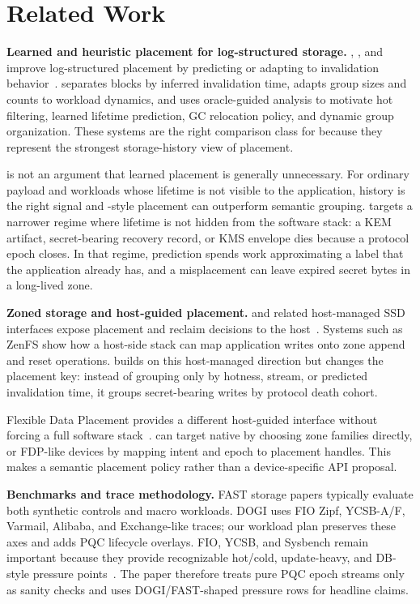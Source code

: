 \section{Related Work}

\noindent\textbf{Learned and heuristic placement for log-structured storage.}
\sepbit, \midas, and \dogi improve log-structured placement by predicting or adapting to invalidation behavior~\cite{sepbit,midas,dogi}.  \sepbit separates blocks by inferred invalidation time, \midas adapts group sizes and counts to workload dynamics, and \dogi uses oracle-guided analysis to motivate hot filtering, learned lifetime prediction, GC relocation policy, and dynamic group organization.  These systems are the right comparison class for \system because they represent the strongest storage-history view of placement.

\system is not an argument that learned placement is generally unnecessary.  For ordinary payload and workloads whose lifetime is not visible to the application, history is the right signal and \dogi-style placement can outperform semantic grouping.  \system targets a narrower regime where lifetime is not hidden from the software stack: a KEM artifact, secret-bearing recovery record, or KMS envelope dies because a protocol epoch closes.  In that regime, prediction spends work approximating a label that the application already has, and a misplacement can leave expired secret bytes in a long-lived zone.

\noindent\textbf{Zoned storage and host-guided placement.}
\zns and related host-managed SSD interfaces expose placement and reclaim decisions to the host~\cite{zns,zenfs,xnvme}.  Systems such as ZenFS show how a host-side stack can map application writes onto zone append and reset operations.  \system builds on this host-managed direction but changes the placement key: instead of grouping only by hotness, stream, or predicted invalidation time, it groups secret-bearing writes by protocol death cohort.

Flexible Data Placement provides a different host-guided interface without forcing a full \zns software stack~\cite{fdp}.  \system can target native \zns by choosing zone families directly, or FDP-like devices by mapping intent and epoch to placement handles.  This makes \system a semantic placement policy rather than a device-specific API proposal.

\noindent\textbf{Benchmarks and trace methodology.}
FAST storage papers typically evaluate both synthetic controls and macro workloads.  DOGI uses FIO Zipf, YCSB-A/F, Varmail, Alibaba, and Exchange-like traces; our workload plan preserves these axes and adds PQC lifecycle overlays.  FIO, YCSB, and Sysbench remain important because they provide recognizable hot/cold, update-heavy, and DB-style pressure points~\cite{fio,ycsb,sysbench}.  The paper therefore treats pure PQC epoch streams only as sanity checks and uses DOGI/FAST-shaped pressure rows for headline claims.

